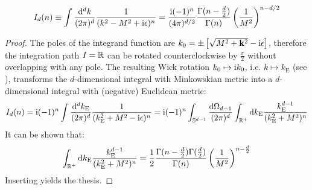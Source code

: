 \begin{lemma}[before upper = {\tcbtitle}]{}{}
  \begin{equation}
    I_d(n) \equiv \int \frac{\mathrm{d}^dk}{(2\pi)^d} \frac{1}{(k^2 - M^2 + \mathrm{i}\epsilon)^n} = \frac{\mathrm{i} (-1)^n}{(4\pi)^{d/2}} \frac{\Gamma(n - \frac{d}{2})}{\Gamma(n)} \left( \frac{1}{M^2} \right)^{n - d/2}
    \label{eq:int-dn}
  \end{equation}
\end{lemma}

\begin{proofbox}
  \begin{proof}
    The poles of the integrand function are $ k_0 = \pm \left[ \sqrt{M^2 + \mathbf{k}^2} - \mathrm{i}\epsilon \right] $, therefore the integration path $ I = \mathbb{R} $ can be rotated counterclockwise by $ \frac{\pi}{2} $ without overlapping with any pole. The resulting Wick rotation $ k_0 \mapsto \mathrm{i} k_0 $, i.e. $ k \mapsto k_\text{E} $ (see ), transforms the $ d $-dimensional integral with Minkowskian metric into a $ d $-dimensional integral with (negative) Euclidean metric:
    \begin{equation*}
      I_d(n) = \mathrm{i} (-1)^n \int \frac{\mathrm{d}^dk_\text{E}}{(2\pi)^d} \frac{1}{(k_\text{E}^2 + M^2 - \mathrm{i}\epsilon)^n} = \mathrm{i} (-1)^n \int_{\mathbb{S}^{d-1}} \frac{\mathrm{d} \Omega_{d-1}}{(2\pi)^d} \int_{\mathbb{R}^+} \mathrm{d} k_\text{E} \frac{k_\text{E}^{d-1}}{(k_\text{E}^2 + M^2)^n}
    \end{equation*}
    It can be shown that:
    \begin{equation}
      \int_{\mathbb{R}^+} \mathrm{d} k_\text{E} \frac{k_\text{E}^{d-1}}{(k_\text{E}^2 + M^2)^n} = \frac{1}{2} \frac{\Gamma(n - \frac{d}{2}) \Gamma(\frac{d}{2})}{\Gamma(n)} \left( \frac{1}{M^2} \right)^{n - \frac{d}{2}}
      \label{eq:auxiliary-integral}
    \end{equation}
    Inserting  yields the thesis.
  \end{proof}
\end{proofbox}

